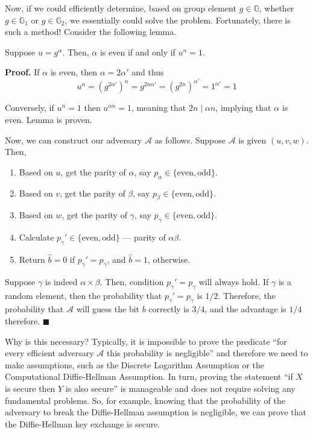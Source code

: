 \documentclass[../lecture-notes.tex]{subfiles}
\begin{document}
Now, if we could efficiently determine, based on group element $g \in \mathbb{G}$, whether $g \in \mathbb{G}_1$ or $g \in \mathbb{G}_2$, we essentially could solve the problem. Fortunately, there is such a method! Consider the following lemma.

\begin{lemma}
    Suppose $u=g^{\alpha}$. Then, $\alpha$ is even if and only if $u^n = 1$.
\end{lemma}

\textbf{Proof.} If $\alpha$ is even, then $\alpha = 2\alpha'$ and thus
\begin{equation}
    u^n = (g^{2\alpha'})^n = g^{2n\alpha'} = (g^{2n})^{\alpha'} = 1^{\alpha'} = 1
\end{equation}

Conversely, if $u^n = 1$ then $u^{\alpha n}=1$, meaning that $2n \mid \alpha n$, implying that $\alpha$ is even. Lemma is proven.

Now, we can construct our adversary $\mathcal{A}$ as follows. Suppose $\mathcal{A}$ is given $(u,v,w)$. Then,
\begin{enumerate}
    \item Based on $u$, get the parity of $\alpha$, say $p_{\alpha} \in \{\text{even}, \text{odd}\}$.
    \item Based on $v$, get the parity of $\beta$, say $p_{\beta} \in \{\text{even}, \text{odd}\}$.
    \item Based on $w$, get the parity of $\gamma$, say $p_{\gamma} \in \{\text{even}, \text{odd}\}$.
    \item Calculate $p_{\gamma}'\in \{\text{even}, \text{odd}\}$ --- parity of $\alpha\beta$.
    \item Return $\hat{b}=0$ if $p_{\gamma}' = p_{\gamma}$, and $\hat{b}=1$, otherwise.
\end{enumerate}

Suppose $\gamma$ is indeed $\alpha \times \beta$. Then, condition $p_{\gamma}'=p_{\gamma}$ will always hold. If $\gamma$ is a random element, then the probability that $p_{\gamma}'=p_{\gamma}$ is $1/2$. Therefore, the probability that $\mathcal{A}$ will guess the bit $b$ correctly is $3/4$, and the advantage is $1/4$ therefore. $\blacksquare$

\vspace{10pt}

Why is this necessary? Typically, it is impossible to prove the predicate ``for every efficient adversary $\mathcal{A}$ this probability is negligible'' and therefore we need to make assumptions, such as the Discrete Logarithm Assumption or the Computational Diffie-Hellman Assumption. In turn, proving the statement ``if $X$ is secure then $Y$ is also secure'' is manageable and does not require solving any fundamental problems. So, for example,
knowing that the probability of the adversary to break the Diffie-Hellman assumption is negligible, we can prove that the Diffie-Hellman key exchange is secure. 
\end{document}
